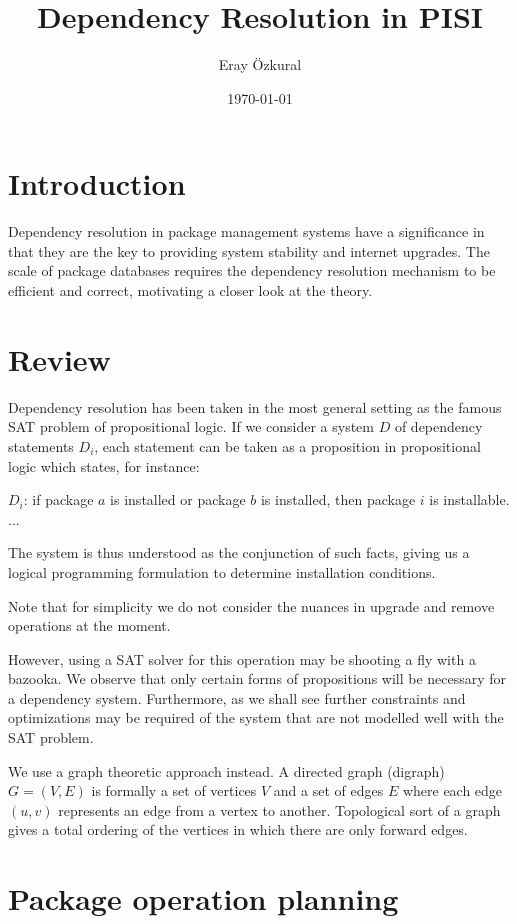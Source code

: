 \documentclass[a4paper,11pt]{article}
\title{ Dependency Resolution in PISI}
\author{Eray \"{O}zkural}
\date{\today}
\begin{document}
\maketitle

\section{Introduction}

Dependency resolution in package management systems have a
significance in that they are the key to providing system stability
and internet upgrades. The scale of package databases requires the
dependency resolution mechanism to be efficient and correct,
motivating a closer look at the theory.


\section{Review}

Dependency resolution has been taken in the most general setting as
the famous SAT problem of propositional logic. If we consider a system
$D$ of dependency statements $D_i$, each statement can be taken as a
proposition in propositional logic which states, for instance:

$D_i$: if package $a$ is installed or package $b$ is installed, then
package $i$ is installable.\\
...

The system is thus understood as the conjunction of such facts, giving
us a logical programming formulation to determine installation conditions.

Note that for simplicity we do not consider the nuances in upgrade and
remove operations at the moment.

However, using a SAT solver for this operation may be shooting a fly
with a bazooka. We observe that only certain forms of propositions
will be necessary for a dependency system. Furthermore, as we shall
see further constraints and optimizations may be required of the
system that are not modelled well with the SAT problem.

We use a graph theoretic approach instead. A directed graph (digraph)
$G=(V,E)$ is formally a set of vertices $V$ and a set of edges $E$
where each edge $(u,v)$ represents an edge from a vertex to
another. Topological sort of a graph gives a total ordering of the
vertices in which there are only forward edges. 

\section{Package operation planning}
\end{document}
